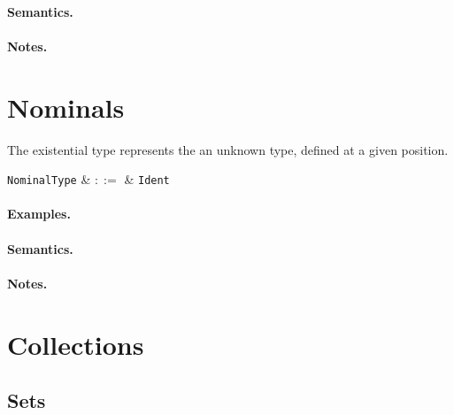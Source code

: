 \paragraph{Semantics.}

\paragraph{Notes.}


\section{Nominals}

The existential type represents the an unknown type, defined at a given position.

\begin{syntax}
  \verb+NominalType+ & $::=$ & \verb+Ident+\\
\end{syntax}

\paragraph{Examples.}

\paragraph{Semantics.}

\paragraph{Notes.}


\section{Collections}


\subsection{Sets}

